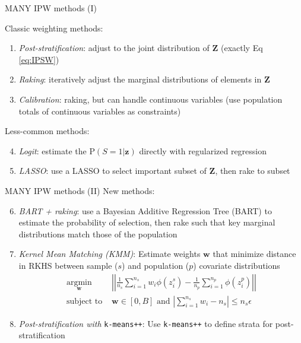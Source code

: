 \documentclass[ignorenonframetext,]{beamer}
\begin{document}
\begin{frame}{MANY IPW methods (I)}

Classic weighting methods:

\begin{enumerate}
	\item
	\emph{Post-stratification}: adjust to the joint distribution of \(\mathbf{Z}\) (exactly Eq \ref*{eq:IPSW})
	\item
	\emph{Raking}: iteratively adjust the marginal distributions of elements in \(\mathbf{Z}\)
	\item
	\emph{Calibration}: raking, but can handle continuous variables (use population totals of continuous variables as constraints)
\end{enumerate}

\pause
Less-common methods:

\begin{enumerate}
	\setcounter{enumi}{3}
	\item
	\emph{Logit}: estimate the $\text{P}(S = 1 | \mathbf{z})$ directly with regularized regression
	\item
	\emph{LASSO}: use a LASSO to select important subset of $\mathbf{Z}$, then rake to subset
\end{enumerate}

\end{frame}


\begin{frame}{MANY IPW methods (II)}
New methods:
\begin{enumerate}
	\setcounter{enumi}{5}
	\item \emph{BART + raking}: use a Bayesian Additive Regression Tree (BART)
	to estimate the probability of selection, then rake such that key
	marginal distributions match those of the population
	\pause
	\item \emph{Kernel Mean Matching (KMM)}: Estimate weights $\mathbf{w}$ that minimize distance in RKHS between sample ($s$) and population ($p$) covariate distributions
	\begin{align*}
	\underset{\mathbf{w}}{\operatorname{argmin}} & \left| \left| \frac{1}{n_{s}} \sum_{i = 1}^{n_{s}} w_i \phi(z_i^{s})  - \frac{1}{n_{p}} \sum_{i = 1}^{n_{p}} \phi(z^{p}_i) \right| \right| \\
	\text{subject to }& \mathbf{w} \in [0, B] \text{ and } \left| \sum_{i = 1}^{n_{s}} w_i - n_{s} \right| \leq n_{s}\epsilon
	\end{align*}
	\pause
	\item \emph{Post-stratification with} \texttt{k-means++}: Use \texttt{k-means++} to define strata for post-stratification
\end{enumerate}
\end{frame}
\end{document}
